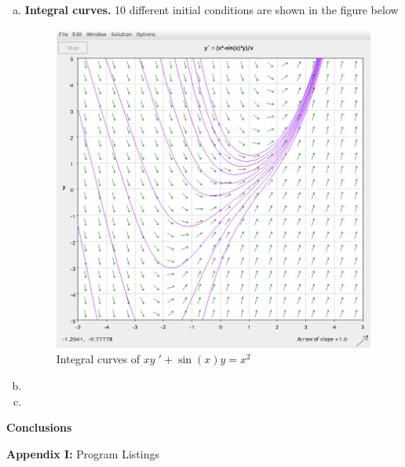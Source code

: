 \documentclass[a4paper,12pt]{article}
\begin{document}
\begin{enumerate}[I.]
\begin{enumerate}[a)]
    \item \textbf{Integral curves.} 10 different initial conditions are shown in the figure below
        \begin{figure}[H]
      \begin{center}
        \includegraphics[scale=.3]{32.png}
        \caption{Integral curves of $xy\;' + \sin(x)y = x^2$}
        \label{fig:6}
      \end{center}
    \end{figure}
    \item
    \item
  \end{enumerate}
  \textbf{Conclusions}
  
  \textbf{Appendix I:} Program Listings
  
  
  
  
\end{enumerate}
\end{document}
